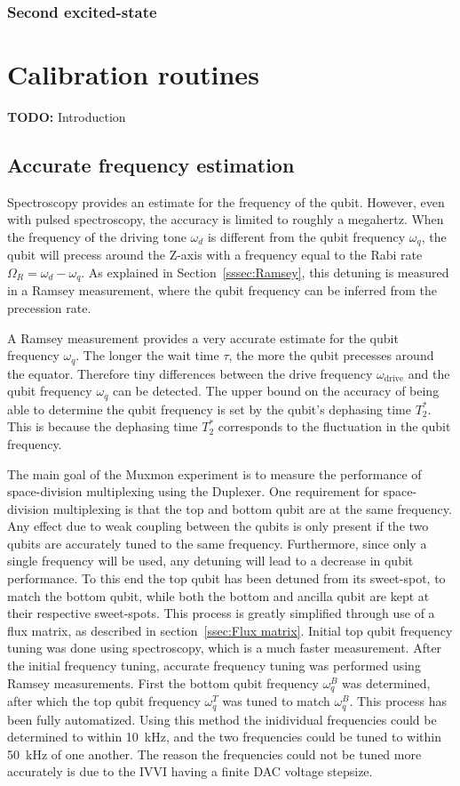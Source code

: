       \subsection{Second excited-state}
        \label{ssec:Second excited-state}

  \chapter{Calibration routines}
    \label{ch:Calibration routines}
    \textbf{TODO:} Introduction
    \section{Accurate frequency estimation}
      Spectroscopy provides an estimate for the frequency of the qubit. However, even with pulsed spectroscopy, the accuracy is limited to roughly a megahertz. When the frequency of the driving tone $\omega_d$ is different from the qubit frequency $\omega_q$, the qubit will precess around the Z-axis with a frequency equal to the Rabi rate $\Omega_R = \omega_d - \omega_q$. As explained in Section~\ref{sssec:Ramsey}, this detuning is measured in a Ramsey measurement, where the qubit frequency can be inferred from the precession rate.

      A Ramsey measurement provides a very accurate estimate for the qubit frequency $\omega_q$. The longer the wait time $\tau$, the more the qubit precesses around the equator. Therefore tiny differences between the drive frequency $\omega_\text{drive}$ and the qubit frequency $\omega_q$ can be detected. The upper bound on the accuracy of being able to determine the qubit frequency is set by the qubit's dephasing time $T_2^*$. This is because the dephasing time $T_2^*$ corresponds to the fluctuation in the qubit frequency.

      The main goal of the Muxmon experiment is to measure the performance of space-division multiplexing using the Duplexer. One requirement for space-division multiplexing is that the top and bottom qubit are at the same frequency. Any effect due to weak coupling between the qubits is only present if the two qubits are accurately tuned to the same frequency. Furthermore, since only a single frequency will be used, any detuning will lead to a decrease in qubit performance. To this end the top qubit has been detuned from its sweet-spot, to match the bottom qubit, while both the bottom and ancilla qubit are kept at their respective sweet-spots. This process is greatly simplified through use of a flux matrix, as described in section~\ref{ssec:Flux matrix}. Initial top qubit frequency tuning was done using spectroscopy, which is a much faster measurement. After the initial frequency tuning, accurate frequency tuning was performed using Ramsey measurements. First the bottom qubit frequency $\omega_q^B$ was determined, after which the top qubit frequency $\omega_q^T$  was tuned to match $\omega_q^B$. This process has been fully automatized. Using this method the inidividual frequencies could be determined to within \SI{10}{\kilo \hertz}, and the two frequencies could be tuned to within \SI{50}{\kilo \hertz} of one another. The reason the frequencies could not be tuned more accurately is due to the IVVI having a finite DAC voltage stepsize.

